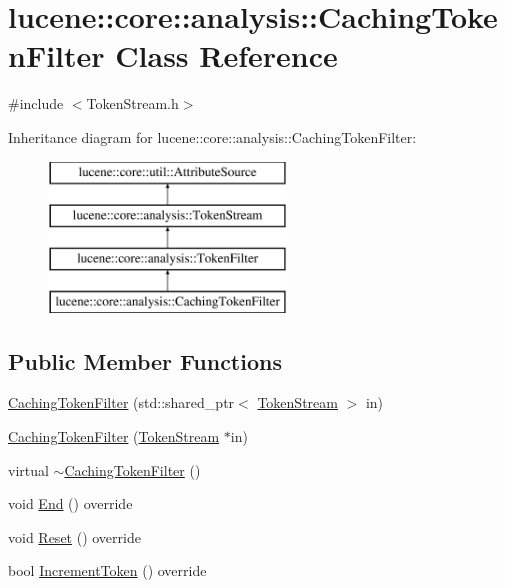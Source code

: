 \hypertarget{classlucene_1_1core_1_1analysis_1_1CachingTokenFilter}{}\section{lucene\+:\+:core\+:\+:analysis\+:\+:Caching\+Token\+Filter Class Reference}
\label{classlucene_1_1core_1_1analysis_1_1CachingTokenFilter}


{\ttfamily \#include $<$Token\+Stream.\+h$>$}

Inheritance diagram for lucene\+:\+:core\+:\+:analysis\+:\+:Caching\+Token\+Filter\+:\begin{figure}[H]
\begin{center}
\leavevmode
\includegraphics[height=4.000000cm]{classlucene_1_1core_1_1analysis_1_1CachingTokenFilter}
\end{center}
\end{figure}
\subsection*{Public Member Functions}
\begin{DoxyCompactItemize}
\item 
\mbox{\hyperlink{classlucene_1_1core_1_1analysis_1_1CachingTokenFilter_acbcb907639dbeeb5fc0f9925b804438f}{Caching\+Token\+Filter}} (std\+::shared\+\_\+ptr$<$ \mbox{\hyperlink{classlucene_1_1core_1_1analysis_1_1TokenStream}{Token\+Stream}} $>$ in)
\item 
\mbox{\hyperlink{classlucene_1_1core_1_1analysis_1_1CachingTokenFilter_ae15751d487684a8d3b0835b69fd8f976}{Caching\+Token\+Filter}} (\mbox{\hyperlink{classlucene_1_1core_1_1analysis_1_1TokenStream}{Token\+Stream}} $\ast$in)
\item 
virtual \mbox{\hyperlink{classlucene_1_1core_1_1analysis_1_1CachingTokenFilter_acbad05f7b0c43c2be38c616c7dbe3dfa}{$\sim$\+Caching\+Token\+Filter}} ()
\item 
void \mbox{\hyperlink{classlucene_1_1core_1_1analysis_1_1CachingTokenFilter_a7241be5e51e730f4e311572510de147e}{End}} () override
\item 
void \mbox{\hyperlink{classlucene_1_1core_1_1analysis_1_1CachingTokenFilter_adde877fb8c464d6eb2766bd400a1499c}{Reset}} () override
\item 
bool \mbox{\hyperlink{classlucene_1_1core_1_1analysis_1_1CachingTokenFilter_acea0a0a5ee61ab8831209c96fde49dc8}{Increment\+Token}} () override
\end{DoxyCompactItemize}
